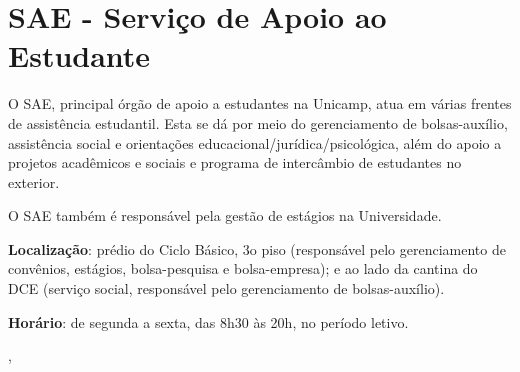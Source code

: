 \section{SAE - Serviço de Apoio ao Estudante}

O SAE, principal órgão de apoio a estudantes na Unicamp, atua em várias frentes de
assistência estudantil. Esta se dá por meio do gerenciamento de bolsas-auxílio,
assistência social e orientações educacional/jurídica/psicológica, além do apoio a
projetos acadêmicos e sociais e programa de intercâmbio de estudantes no exterior.

O SAE também é responsável pela gestão de estágios na Universidade.

\textbf{Localização}: prédio do Ciclo Básico, 3o piso (responsável pelo gerenciamento de
convênios, estágios, bolsa-pesquisa e bolsa-empresa); e ao lado da cantina do DCE
(serviço social, responsável pelo gerenciamento de bolsas-auxílio).

\textbf{Horário}: de segunda a sexta, das 8h30 às 20h, no período letivo.

\begin{tags}
     \sep {}
\end{tags}